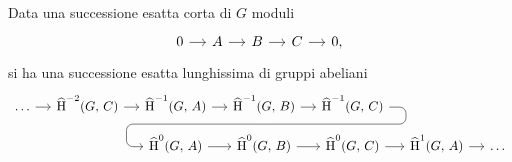 \begin{theorem}\label{fond2}
	Data una successione esatta corta di $ G $ moduli
	\[\begin{tikzcd}[column sep = small]
	0 \rar & A \rar & B \rar & C \rar & 0,
	\end{tikzcd}\]
	si ha una successione esatta lunghissima di gruppi abeliani
	\[\begin{tikzcd}[column sep = small, row sep = small]
	\dots \rar & \Hhh^{-2}(G, \, C) \rar &\Hhh^{-1}(G, \, A) \rar & \Hhh^{-1}(G, \, B) \arrow[d,phantom, ""{coordinate, name=W}] \rar & \Hhh^{-1}(G, \, C) \arrow[dll, 
	rounded corners = 5 pt, 
	to path={ --([xshift=3ex]\tikztostart.east)
		|- (W)[near end]\tikztonodes
		-| ([xshift=-3ex]\tikztotarget.west)
		-- (\tikztotarget)}] && \\
	&&\Hhh^0(G, \, A) \rar & \Hhh^0(G, \, B) \rar & \Hhh^0(G, \, C) \rar
	 & \Hhh^1(G, \, A) \rar & \dots \end{tikzcd}\]
\end{theorem}
